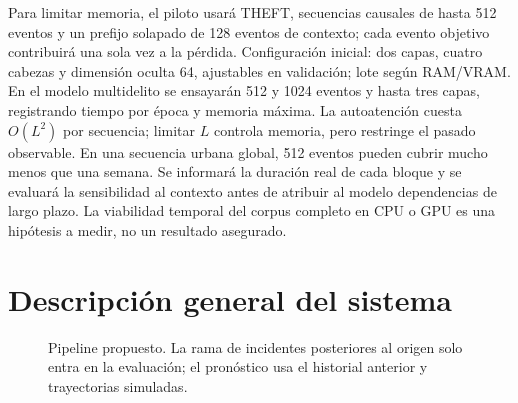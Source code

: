 \documentclass[10pt,a4paper,twocolumn]{article}
\begin{document}
Para limitar memoria, el piloto usará THEFT, secuencias causales de hasta 512 eventos y un prefijo solapado de 128 eventos de contexto; cada evento objetivo contribuirá una sola vez a la pérdida. Configuración inicial: dos capas, cuatro cabezas y dimensión oculta 64, ajustables en validación; lote según RAM/VRAM. En el modelo multidelito se ensayarán 512 y 1024 eventos y hasta tres capas, registrando tiempo por época y memoria máxima. La autoatención cuesta $O(L^2)$ por secuencia; limitar $L$ controla memoria, pero restringe el pasado observable. En una secuencia urbana global, 512 eventos pueden cubrir mucho menos que una semana. Se informará la duración real de cada bloque y se evaluará la sensibilidad al contexto antes de atribuir al modelo dependencias de largo plazo. La viabilidad temporal del corpus completo en CPU o GPU es una hipótesis a medir, no un resultado asegurado.

\section{Descripción general del sistema}
\begin{figure}[t]
\centering
{}
\caption{Pipeline propuesto. La rama de incidentes posteriores al origen solo entra en la evaluación; el pronóstico usa el historial anterior y trayectorias simuladas.}
\label{fig:pipeline}
\end{figure}
\end{document}
